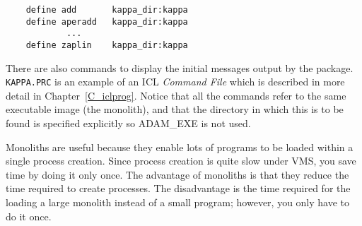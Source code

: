 \begin{small}
\begin{verbatim}
    define add       kappa_dir:kappa
    define aperadd   kappa_dir:kappa
            ...
    define zaplin    kappa_dir:kappa
\end{verbatim}
\end{small}

There are also commands to display the initial messages output by the package.
{\small\tt KAPPA.PRC} is an example of an ICL {\em Command File} which is
described in more detail in Chapter~\ref{C_iclprog}.
Notice that all the commands refer to the same executable image (the monolith),
and that the directory in which this is to be found is specified explicitly so
ADAM\_EXE is not used.

Monoliths are useful because they enable lots of programs to be loaded within
a single process creation.
Since process creation is quite slow under VMS, you save time by doing it
only once.
The advantage of monoliths is that they reduce the time required to create
processes.
The disadvantage is the time required for the loading a large monolith
instead of a small program; however, you only have to do it once.
